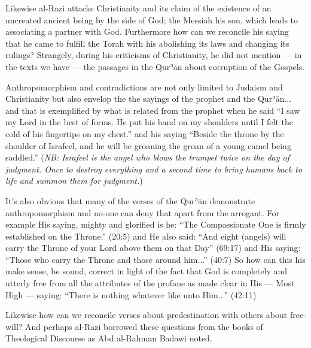 \documentclass[12pt]{book}
\def \Quran{Qurʾān} %
\def \Qrn{\Quran}   %
\newcommand{\NB}[1]{\emph{NB: #1}}
\begin{document}
Likewise al-Razi attacks Christianity and its claim of the existence of
an uncreated ancient being by the side of God;
the Messiah his son, which leads to associating a partner with God.
Furthermore how can we reconcile his saying that he came to fulfill the Torah
with his abolishing its laws and changing its rulings?
Strangely, during his criticisms of Christianity,
he did not mention — in the texts we have —
the passages in the \Qrn{} about corruption of the Gospels.\footnotemark


Anthropomorphism and contradictions are not only limited to Judaism and
Christianity but also envelop the the sayings of the prophet and the \Quran...
and that is exemplified by what is related from the prophet when he said
“I saw my Lord in the best of forms.
He put his hand on my shoulders until I felt
the cold of his fingertips on my chest.”\footnotemark
{}
and his saying “Beside the throne by the shoulder of Israfeel,
and he will be groaning the groan of a young camel being saddled.”\footnotemark
(\NB{Israfeel is the angel who blows the trumpet twice on the day of judgment.
Once to destroy everything and a second time to bring humans back to life and
summon them for judgment.})


It’s also obvious that many of the verses of the \Qrn{} demonstrate
anthropomorphism and no-one can deny that apart from the arrogant.
For example His saying, mighty and glorified is he:
“The Compassionate One is firmly established on the Throne.” (20:5)
and He also said: “And eight (angels) will carry the Throne of your Lord
above them on that Day” (69:17) and His saying:
“Those who carry the Throne and those around him...” (40:7)
So how can this his make sense, be sound, correct in light of the fact that
God is completely and utterly free from all the attributes of the profane as
made clear in His — Most High — saying:
“There is nothing whatever like unto Him...” (42:11)

Likewise how can we reconcile verses about predestination
with others about free-will?
And perhaps al-Razi borrowed these questions from the books of
Theological Discourse as Abd al-Rahman Badawi noted.\footnotemark

\end{document}
